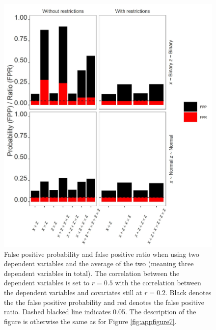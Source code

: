 \begin{landscape}
\scriptsize

\end{landscape}



\begin{figure}[hbt!]
\includegraphics{R/Analysis/Result/Figures/Figure3SIBon.jpeg}
\centering
\caption{False positive probability and false positive ratio when using two dependent variables and the average of the two (meaning three dependent variables in total). The correlation between the dependent variables is set to  $\textit{r}=0.5$ with the correlation between the dependent variables and covariates still at  $\textit{r}=0.2$. Black denotes the the false positive probability and red denotes the false positive ratio. Dashed blacked line indicates 0.05. The description of the figure is otherwise the same as for Figure \ref{fig:appfigure7}.}
\label{fig:appfigure9}
\end{figure}



\begin{landscape}
\scriptsize

\end{landscape}

